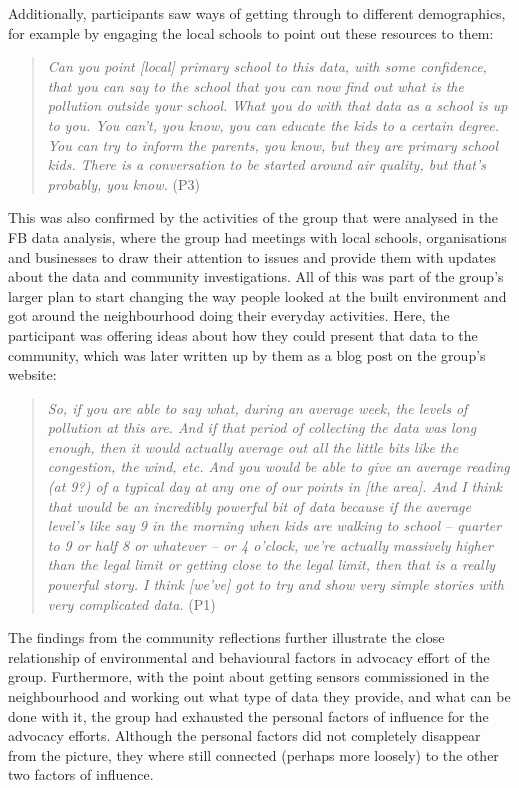Additionally, participants saw ways of getting through to different demographics, for example by engaging the local schools to point out these resources to them:
\begin{quote}
    \textit{Can you point [local] primary school to this data, with some confidence, that you can say to the school that you can now find out what is the pollution outside your school. What you do with that data as a school is up to you. You can't, you know, you can educate the kids to a certain degree. You can try to inform the parents, you know, but they are primary school kids. There is a conversation to be started around air quality, but that's probably, you know.} (P3)
\end{quote}
This was also confirmed by the activities of the group that were analysed in the FB data analysis, where the group had meetings with local schools, organisations and businesses to draw their attention to issues and provide them with updates about the data and community investigations. All of this was part of the group's larger plan to start changing the way people looked at the built environment and got around the neighbourhood doing their everyday activities. Here, the participant was offering ideas about how they could present that data to the community, which was later written up by them as a blog post on the group's website:
\begin{quote}
    \textit{So, if you are able to say what, during an average week, the levels of pollution at this are. And if that period of collecting the data was long enough, then it would actually average out all the little bits like the congestion, the wind, etc. And you would be able to give an average reading (at 9?) of a typical day at any one of our points in [the area]. And I think that would be an incredibly powerful bit of data because if the average level's like say 9 in the morning when kids are walking to school -- quarter to 9 or half 8 or whatever -- or 4 o'clock, we're actually massively higher than the legal limit or getting close to the legal limit, then that is a really powerful story. I think [we've] got to try and show very simple stories with very complicated data.} (P1)
\end{quote}

The findings from the community reflections further illustrate the close relationship of environmental and behavioural factors in advocacy effort of the group. Furthermore, with the point about getting sensors commissioned in the neighbourhood and working out what type of data they provide, and what can be done with it, the group had exhausted the personal factors of influence for the advocacy efforts. Although the personal factors did not completely disappear from the picture, they where still connected (perhaps more loosely) to the other two factors of influence.

